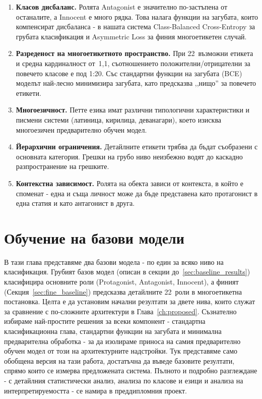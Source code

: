 \documentclass[12pt,a4paper]{report}
\begin{document}
\begin{enumerate}
  \item \textbf{Класов дисбаланс.} Ролята Antagonist е значително по-застъпена от останалите, а Innocent е много рядка. Това налага функции на загубата, които компенсират дисбаланса - в нашата система Class-Balanced Cross-Entropy за грубата класификация и Asymmetric Loss за финия многоетикетен случай.

  \item \textbf{Разреденост на многоетикетното пространство.} При 22~възможни етикета и средна кардиналност от~1,1, съотношението положителни/отрицателни за повечето класове е под 1:20. Със стандартни функции на загубата (BCE) моделът най-лесно минимизира загубата, като предсказва ,,нищо'' за повечето етикети.

  \item \textbf{Многоезичност.} Петте езика имат различни типологични характеристики и писмени системи (латиница, кирилица, деванагари), което изисква многоезичен предварително обучен модел.

  \item \textbf{Йерархични ограничения.} Детайлните етикети трябва да бъдат съобразени с основната категория. Грешки на грубо ниво неизбежно водят до каскадно разпространение на грешките.

  \item \textbf{Контекстна зависимост.} Ролята на обекта зависи от контекста, в който е споменат - една и съща личност може да бъде представена като протагонист в една статия и като антагонист в друга.
\end{enumerate}


\chapter{Обучение на базови модели}
\label{ch:baseline}

В тази глава представяме два базови модела - по един за всяко ниво на класификация. Грубият базов модел (описан в секции до~\ref{sec:baseline_results}) класифицира основните роли (Protagonist, Antagonist, Innocent), а финият (Секция~\ref{sec:fine_baseline}) предсказва детайлните 22~роли в многоетикетна постановка. Целта е да установим начални резултати за двете нива, които служат за сравнение с по-сложните архитектури в Глава~\ref{ch:proposed}. Съзнателно избираме най-простите решения за всеки компонент - стандартна класификационна глава, стандартни функции на загубата и минимална предварителна обработка - за да изолираме приноса на самия предварително обучен модел от този на архитектурните надстройки. Тук представяме само обобщена версия на тази работа, достатъчна да въведе базовите резултати, спрямо които се измерва предложената система. Пълното и подробно разглеждане - с детайлния статистически анализ, анализа по класове и езици и анализа на интерпретируемостта - се намира в преддипломния проект.
\end{document}
